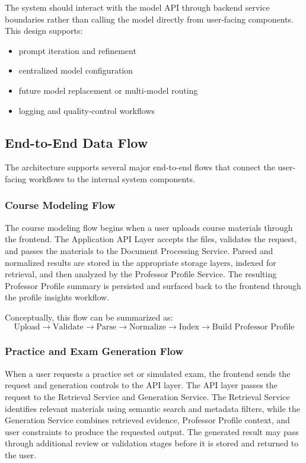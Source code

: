 \documentclass[11pt]{article}
\begin{document}
The system should interact with the model API through backend service boundaries rather than calling the model directly from user-facing components. This design supports:
\begin{itemize}
\item prompt iteration and refinement
\item centralized model configuration
\item future model replacement or multi-model routing
\item logging and quality-control workflows
\end{itemize}

\subsection{End-to-End Data Flow}
The architecture supports several major end-to-end flows that connect the user-facing workflows to the internal system components.

\subsubsection{Course Modeling Flow}
The course modeling flow begins when a user uploads course materials through the frontend. The Application API Layer accepts the files, validates the request, and passes the materials to the Document Processing Service. Parsed and normalized results are stored in the appropriate storage layers, indexed for retrieval, and then analyzed by the Professor Profile Service. The resulting Professor Profile summary is persisted and surfaced back to the frontend through the profile insights workflow.

Conceptually, this flow can be summarized as:
\[
\text{Upload} \rightarrow \text{Validate} \rightarrow \text{Parse} \rightarrow \text{Normalize} \rightarrow \text{Index} \rightarrow \text{Build Professor Profile}
\]

\subsubsection{Practice and Exam Generation Flow}
When a user requests a practice set or simulated exam, the frontend sends the request and generation controls to the API layer. The API layer passes the request to the Retrieval Service and Generation Service. The Retrieval Service identifies relevant materials using semantic search and metadata filters, while the Generation Service combines retrieved evidence, Professor Profile context, and user constraints to produce the requested output. The generated result may pass through additional review or validation stages before it is stored and returned to the user.
\end{document}
